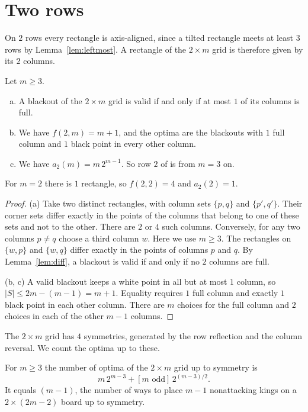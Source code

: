 \section{Two rows}\label{sec:strip}

On $2$ rows every rectangle is axis-aligned, since a tilted rectangle meets at
least $3$ rows by Lemma~\ref{lem:leftmost}. A rectangle of the $2\times m$ grid
is therefore given by its $2$ columns.

\begin{theorem}\label{thm:strip}
Let $m\ge3$.
\begin{enumerate}[(a)]
\item A blackout of the $2\times m$ grid is valid if and only if at most $1$ of
its columns is full.
\item We have $f(2,m)=m+1$, and the optima are the blackouts with $1$ full column
and $1$ black point in every other column.
\item We have $a_2(m)=m\,2^{m-1}$. So row $2$ of  is
 from $m=3$ on.
\end{enumerate}
For $m=2$ there is $1$ rectangle, so $f(2,2)=4$ and $a_2(2)=1$.
\end{theorem}

\begin{proof}
(a) Take two distinct rectangles, with column sets $\{p,q\}$ and $\{p',q'\}$.
Their corner sets differ exactly in the points of the columns that belong to
one of these sets and not to the other. There are $2$ or $4$ such columns.
Conversely, for any two columns $p\ne q$ choose a third column $w$. Here we
use $m\ge3$. The rectangles on $\{w,p\}$ and $\{w,q\}$ differ exactly in
the points of columns $p$ and $q$. By Lemma~\ref{lem:diff}, a blackout is
valid if and only if no $2$ columns are full.

(b, c) A valid blackout keeps a white point in all but at most $1$ column, so
$|S|\le2m-(m-1)=m+1$. Equality requires $1$ full column and exactly $1$ black
point in each other column. There are $m$ choices for the full column and $2$
choices in each of the other $m-1$ columns.
\end{proof}

The $2\times m$ grid has $4$ symmetries, generated by the row reflection and
the column reversal. We count the optima up to these.

\begin{proposition}\label{prop:kings}
For $m\ge3$ the number of optima of the $2\times m$ grid up to symmetry is
\[
m\,2^{m-3}+[m\text{ odd}]\,2^{(m-3)/2}.
\]
It equals $(m-1)$, the number of ways to place $m-1$
nonattacking kings on a $2\times(2m-2)$ board up to symmetry.
\end{proposition}

